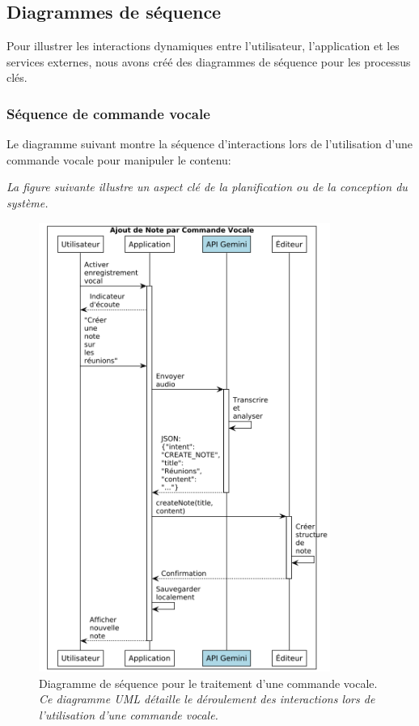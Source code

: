 \subsection{Diagrammes de séquence}

Pour illustrer les interactions dynamiques entre l'utilisateur, l'application et les services externes, nous avons créé des diagrammes de séquence pour les processus clés.

\subsubsection{Séquence de commande vocale}

Le diagramme suivant montre la séquence d'interactions lors de l'utilisation d'une commande vocale pour manipuler le contenu:

\noindent
\textit{La figure suivante illustre un aspect clé de la planification ou de la conception du système.}
\begin{figure}[H]
    \centering
    \includegraphics[width=0.85\textwidth]{assets/docs/voicenotion_sequence_voice.png}
    \caption{Diagramme de séquence pour le traitement d'une commande vocale. \newline\textit{Ce diagramme UML détaille le déroulement des interactions lors de l'utilisation d'une commande vocale.}}
    \label{fig:sequence_voice_command}
\end{figure}

